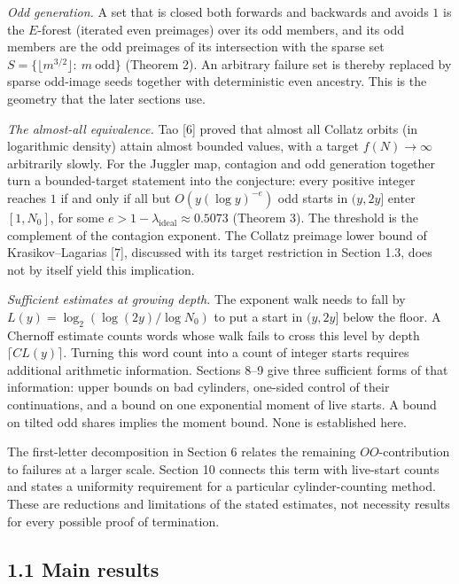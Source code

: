 \documentclass[11pt,a4paper]{article}
\begin{document}
\emph{Odd generation.} A set that is closed both forwards and backwards
and avoids \(1\) is the \(E\)-forest (iterated even preimages) over its
odd members, and its odd members are the odd preimages of its
intersection with the sparse set \(S=\{\lfloor m^{3/2}\rfloor:\ m\
\text{odd}\}\) (Theorem 2). An arbitrary failure set is thereby replaced
by sparse odd-image seeds together with deterministic even ancestry.
This is the geometry that the later sections use.

\emph{The almost-all equivalence.} Tao {[}6{]} proved that almost all
Collatz orbits (in logarithmic density) attain almost bounded values,
with a target \(f(N)\to\infty\) arbitrarily slowly. For the Juggler map,
contagion and odd generation together turn a bounded-target statement
into the conjecture: every positive integer reaches \(1\) if and only if
all but \(O(y(\log y)^{-e})\) odd starts in \((y,2y]\) enter
\([1,N_0]\), for some \(e>1-\lambda_{\mathrm{ideal}}\approx0.5073\)
(Theorem 3). The threshold is the complement of the contagion exponent.
The Collatz preimage lower bound of Krasikov--Lagarias {[}7{]},
discussed with its target restriction in Section 1.3, does not by itself
yield this implication.

\emph{Sufficient estimates at growing depth.} The exponent walk needs to
fall by \(L(y)=\log_2(\log(2y)/\log N_0)\) to put a start in \((y,2y]\)
below the floor. A Chernoff estimate counts words whose walk fails to
cross this level by depth \(\lceil CL(y)\rceil\). Turning this word
count into a count of integer starts requires additional arithmetic
information. Sections 8--9 give three sufficient forms of that
information: upper bounds on bad cylinders, one-sided control of their
continuations, and a bound on one exponential moment of live starts. A
bound on tilted odd shares implies the moment bound. None is established
here.

The first-letter decomposition in Section 6 relates the remaining
\(OO\)-contribution to failures at a larger scale. Section 10 connects
this term with live-start counts and states a uniformity requirement for
a particular cylinder-counting method. These are reductions and
limitations of the stated estimates, not necessity results for every
possible proof of termination.

\subsection{1.1 Main results}\label{main-results}
\end{document}
